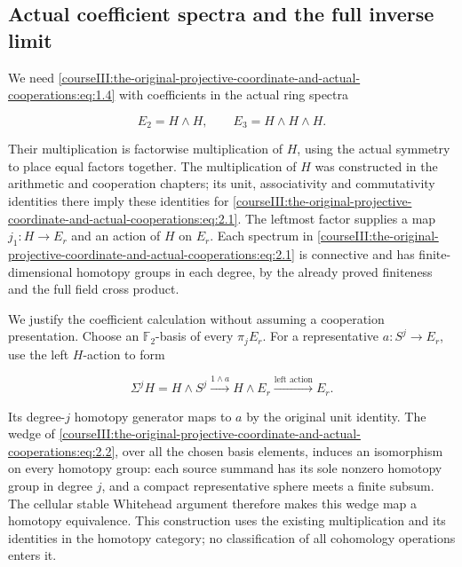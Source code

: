 \subsection{Actual coefficient spectra and the full inverse limit}
\label{courseIII:the-original-projective-coordinate-and-actual-cooperations:projective-coefficient-limit}

\label{courseIII:the-original-projective-coordinate-and-actual-cooperations:section-2}\label{courseIII:projective-coop:2}

We need \eqref{courseIII:the-original-projective-coordinate-and-actual-cooperations:eq:1.4} with coefficients in the actual ring spectra

\begin{equation}
E_2=H\wedge H,\qquad E_3=H\wedge H\wedge H.
 \label{courseIII:the-original-projective-coordinate-and-actual-cooperations:eq:2.1}
\end{equation}

Their multiplication is factorwise multiplication of \(H\), using the actual symmetry to place equal factors together. The multiplication of \(H\) was constructed in the arithmetic and cooperation chapters; its unit, associativity and commutativity identities there imply these identities for \eqref{courseIII:the-original-projective-coordinate-and-actual-cooperations:eq:2.1}. The leftmost factor supplies a map \(j_1:H\to E_r\) and an action of \(H\) on \(E_r\). Each spectrum in \eqref{courseIII:the-original-projective-coordinate-and-actual-cooperations:eq:2.1} is connective and has finite-dimensional homotopy groups in each degree, by the already proved finiteness and the full field cross product.

We justify the coefficient calculation without assuming a cooperation presentation. Choose an \(\mathbb F_2\)-basis of every \(\pi_jE_r\). For a representative \(a:S^j\to E_r\), use the left \(H\)-action to form

\begin{equation}
\Sigma^jH=H\wedge S^j\xrightarrow{1\wedge a}H\wedge E_r
       \xrightarrow{\text{left action}}E_r.
 \label{courseIII:the-original-projective-coordinate-and-actual-cooperations:eq:2.2}
\end{equation}

Its degree-\(j\) homotopy generator maps to \(a\) by the original unit identity. The wedge of \eqref{courseIII:the-original-projective-coordinate-and-actual-cooperations:eq:2.2}, over all the chosen basis elements, induces an isomorphism on every homotopy group: each source summand has its sole nonzero homotopy group in degree \(j\), and a compact representative sphere meets a finite subsum. The cellular stable Whitehead argument therefore makes this wedge map a homotopy equivalence. This construction uses the existing multiplication and its identities in the homotopy category; no classification of all cohomology operations enters it.


